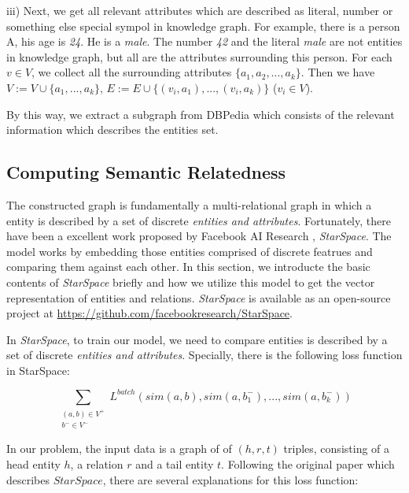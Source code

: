 iii) Next, we get all relevant attributes which are described as literal, number or something 
else special sympol in knowledge graph. For example, there is a person A, his age is \emph{24}. He is a \emph{male}.
The number \emph{42} and the literal \emph{male} are not entities in knowledge graph,
but all are the attributes surrounding this person.
For each $v \in V$, we collect all the surrounding attributes 
$\{a_1, a_2, ..., a_k\}$. Then we have $V:=V \cup \{a_1, ..., a_k\}$, 
$E:=E \cup \{(v_i, a_1), ..., (v_i, a_k)\}$ ($v_i \in V$).

By this way, we extract a subgraph from DBPedia which consists of the relevant information which describes
the entities set.

\subsection{Computing Semantic Relatedness}
The constructed graph is fundamentally a multi-relational graph in which a entity is described by a set of discrete
\emph{entities and attributes}. Fortunately, there have been a excellent work proposed by Facebook AI Research
, \emph{StarSpace}. The model works by embedding those entities comprised of discrete featrues and
comparing them against each other. In this section, we introducte the basic contents of \emph{StarSpace} briefly and
how we utilize this model to get the vector representation of entities and relations. \emph{StarSpace} is available as
an open-source project at \url{https://github.com/facebookresearch/StarSpace}.

In \emph{StarSpace}, to train our model, we need to compare entities is described by a set of discrete
\emph{entities and attributes}. Specially, there is the following loss function in StarSpace:

\begin{small}
    \begin{equation}
        \nonumber
        \label{starspace_formula}
        \sum_{\substack{(a,b) \in V^+\\ b^- \in V^-}}L^{batch}(sim(a,b),sim(a,b_1^-),...,sim(a,b_k^-))
    \end{equation}
\end{small}

In our problem, the input data is a graph of of $(h, r, t)$ triples, consisting of a head entity $h$, 
a relation $r$ and a tail entity $t$.
Following the original paper which describes $StarSpace$, there are several explanations for this loss function:

